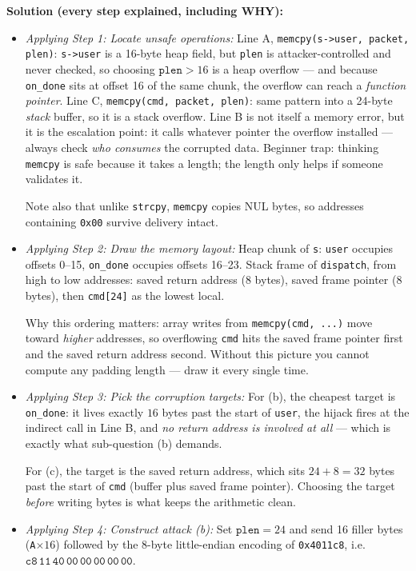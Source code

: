 \documentclass[12pt, a4paper]{article}
\begin{document}
\textbf{Solution (every step explained, including WHY):}
\begin{itemize}
    \item \textit{Applying Step 1: Locate unsafe operations:} Line A, \texttt{memcpy(s->user, packet, plen)}: \texttt{s->user} is a 16-byte heap field, but \texttt{plen} is attacker-controlled and never checked, so choosing $\texttt{plen} > 16$ is a heap overflow --- and because \texttt{on\_done} sits at offset 16 of the same chunk, the overflow can reach a \emph{function pointer}.
    Line C, \texttt{memcpy(cmd, packet, plen)}: same pattern into a 24-byte \emph{stack} buffer, so it is a stack overflow. Line B is not itself a memory error, but it is the escalation point: it calls whatever pointer the overflow installed --- always check \emph{who consumes} the corrupted data.
    Beginner trap: thinking \texttt{memcpy} is safe because it takes a length; the length only helps if someone validates it.

    Note also that unlike \texttt{strcpy}, \texttt{memcpy} copies NUL bytes, so addresses containing \texttt{0x00} survive delivery intact.
    \item \textit{Applying Step 2: Draw the memory layout:} Heap chunk of \texttt{s}: \texttt{user} occupies offsets 0--15, \texttt{on\_done} occupies offsets 16--23. Stack frame of \texttt{dispatch}, from high to low addresses: saved return address (8 bytes), saved frame pointer (8 bytes), then \texttt{cmd[24]} as the lowest local.

    Why this ordering matters: array writes from \texttt{memcpy(cmd, ...)} move toward \emph{higher} addresses, so overflowing \texttt{cmd} hits the saved frame pointer first and the saved return address second. Without this picture you cannot compute any padding length --- draw it every single time.
    \item \textit{Applying Step 3: Pick the corruption targets:} For (b), the cheapest target is \texttt{on\_done}: it lives exactly $16$ bytes past the start of \texttt{user}, the hijack fires at the indirect call in Line B, and \emph{no return address is involved at all} --- which is exactly what sub-question (b) demands.

    For (c), the target is the saved return address, which sits $24 + 8 = 32$ bytes past the start of \texttt{cmd} (buffer plus saved frame pointer). Choosing the target \emph{before} writing bytes is what keeps the arithmetic clean.
    \item \textit{Applying Step 4: Construct attack (b):} Set $\texttt{plen} = 24$ and send 16 filler bytes (\texttt{A}$\times 16$) followed by the 8-byte little-endian encoding of \texttt{0x4011c8}, i.e. $\texttt{c8}\,\texttt{11}\,\texttt{40}\,\texttt{00}\,\texttt{00}\,\texttt{00}\,\texttt{00}\,\texttt{00}$.


\end{itemize}
\end{document}
